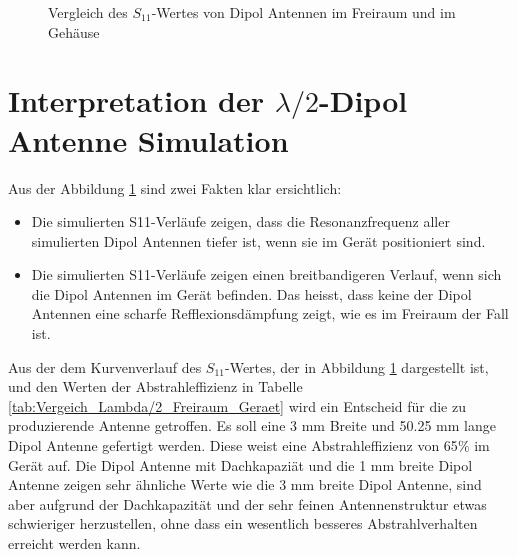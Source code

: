 \begin{figure}[!ht]
	\centering
	\begingroup
	
	\endgroup
	\caption{Vergleich des $S_{11}$-Wertes von Dipol Antennen im Freiraum und im Gehäuse}	
	\label{S11_Vergleich_Simulation_Dipolantenn_freiraum_Geraet}
\end{figure}


\newpage
\section{Interpretation der $\lambda/2$-Dipol Antenne Simulation}
\label{sec:Interpretation_Dipol}

Aus der Abbildung \ref{S11_Vergleich_Simulation_Dipolantenn_freiraum_Geraet} sind zwei Fakten klar ersichtlich: 
\begin{itemize}
\item Die simulierten S11-Verläufe zeigen, dass die Resonanzfrequenz aller simulierten Dipol Antennen tiefer ist, wenn sie im Gerät positioniert sind.
\item Die simulierten S11-Verläufe zeigen einen breitbandigeren Verlauf, wenn sich die Dipol Antennen im Gerät befinden. Das heisst, dass keine der Dipol Antennen  eine scharfe Refflexionsdämpfung zeigt, wie es im Freiraum der Fall ist. 
\end{itemize}
Aus der dem Kurvenverlauf des $S_{11}$-Wertes, der in Abbildung \ref{S11_Vergleich_Simulation_Dipolantenn_freiraum_Geraet} dargestellt ist, und den Werten der Abstrahleffizienz in Tabelle \ref{tab:Vergeich_Lambda/2_Freiraum_Geraet} wird ein Entscheid für die zu produzierende Antenne getroffen. Es soll eine 3 mm Breite und 50.25 mm lange Dipol Antenne gefertigt werden. Diese weist eine Abstrahleffizienz von 65$\%$ im Gerät auf. Die Dipol Antenne mit Dachkapaziät und die 1 mm breite Dipol Antenne zeigen sehr ähnliche Werte wie die 3 mm breite Dipol Antenne, sind aber aufgrund der Dachkapazität und der sehr feinen Antennenstruktur etwas schwieriger herzustellen, ohne dass ein wesentlich besseres Abstrahlverhalten erreicht werden kann.
